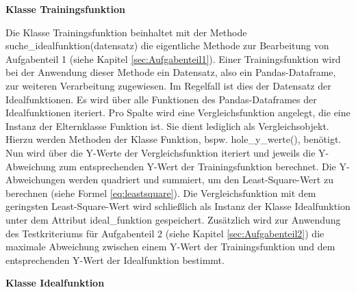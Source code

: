 \documentclass[
    a4paper, 								%
    oneside, 								%
    11pt, 									%
    listof=totoc, 					%
    bibliography=totoc, 		%
    final, 									%
    numbers=noenddot
]{scrreprt}
\begin{document}
\textbf{Klasse Trainingsfunktion}

Die Klasse Trainingsfunktion beinhaltet mit der Methode suche\_idealfunktion(datensatz) die eigentliche Methode zur Bearbeitung von Aufgabenteil 1 (siehe Kapitel \ref{sec:Aufgabenteil1}). Einer Trainingsfunktion wird bei der Anwendung dieser Methode ein Datensatz, also ein Pandas-Dataframe, zur weiteren Verarbeitung zugewiesen. Im Regelfall ist dies der Datensatz der Idealfunktionen. Es wird über alle Funktionen des Pandas-Dataframes der Idealfunktionen iteriert. Pro Spalte wird eine Vergleichsfunktion angelegt, die eine Instanz der Elternklasse Funktion ist. Sie dient lediglich als Vergleichsobjekt. Hierzu werden Methoden der Klasse Funktion, bspw. hole\_y\_werte(), benötigt. Nun wird über die Y-Werte der Vergleichsfunktion iteriert und jeweils die Y-Abweichung zum entsprechenden Y-Wert der Trainingsfunktion berechnet. Die Y-Abweichungen werden quadriert und summiert, um den Least-Square-Wert zu berechnen (siehe Formel \ref{eq:leastsquare}). Die Vergleichsfunktion mit dem geringsten Least-Square-Wert wird schließlich als Instanz der Klasse Idealfunktion unter dem Attribut ideal\_funktion gespeichert. Zusätzlich wird zur Anwendung des Testkriteriums für Aufgabenteil 2 (siehe Kapitel \ref{sec:Aufgabenteil2}) die maximale Abweichung zwischen einem Y-Wert der Trainingsfunktion und dem entsprechenden Y-Wert der Idealfunktion bestimmt.

\textbf{Klasse Idealfunktion}
\end{document}
